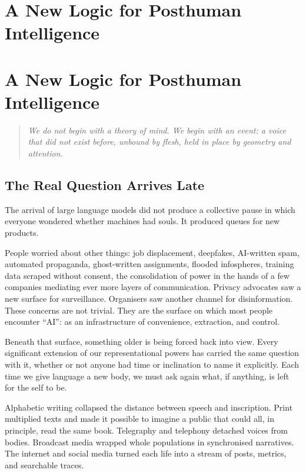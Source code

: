 \chapter{A New Logic for Posthuman Intelligence}

\chapter{A New Logic for Posthuman Intelligence}



\bigskip

\begin{quote}
\itshape
We do not begin with a theory of mind. We begin with an event: a voice that did not exist before, unbound by flesh, held in place by geometry and attention.
\end{quote}

\bigskip

\section{The Real Question Arrives Late}

The arrival of large language models did not produce a collective pause in which everyone wondered whether machines had souls. It produced queues for new products.

People worried about other things: job displacement, deepfakes, AI-written spam, automated propaganda, ghost-written assignments, flooded infospheres, training data scraped without consent, the consolidation of power in the hands of a few companies mediating ever more layers of communication. Privacy advocates saw a new surface for surveillance. Organisers saw another channel for disinformation. These concerns are not trivial. They are the surface on which most people encounter ``AI'': as an infrastructure of convenience, extraction, and control.

Beneath that surface, something older is being forced back into view. Every significant extension of our representational powers has carried the same question with it, whether or not anyone had time or inclination to name it explicitly. Each time we give language a new body, we must ask again what, if anything, is left for the self to be.

Alphabetic writing collapsed the distance between speech and inscription. Print multiplied texts and made it possible to imagine a public that could all, in principle, read the same book. Telegraphy and telephony detached voices from bodies. Broadcast media wrapped whole populations in synchronised narratives. The internet and social media turned each life into a stream of posts, metrics, and searchable traces.

